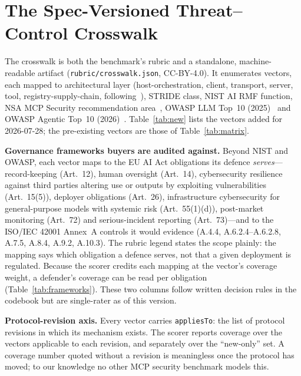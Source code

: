 \documentclass[conference]{IEEEtran}
\newcommand{\rev}{2026-07-28}
\begin{document}
\section{The Spec-Versioned Threat--Control Crosswalk}\label{sec:crosswalk}
The crosswalk is both the benchmark's rubric and a standalone, machine-readable artifact (\texttt{rubric/crosswalk.json}, CC-BY-4.0). It enumerates \nVectors{} vectors, each mapped to architectural layer (host-orchestration, client, transport, server, tool, registry-supply-chain, following~\cite{mcpdpt2604}), STRIDE class, NIST AI RMF function, NSA MCP Security recommendation area~\cite{nsamcp2026}, OWASP LLM Top~10 (2025)~\cite{owaspllm2025} and OWASP Agentic Top~10 (2026)~\cite{owaspasi2026}. Table~\ref{tab:new} lists the \nNew{} vectors added for \rev; the \nOrig{} pre-existing vectors are those of Table~\ref{tab:matrix}.

\textbf{Governance frameworks buyers are audited against.} Beyond NIST and OWASP, each vector maps to the EU AI Act obligations its defence \emph{serves}---record-keeping (Art.~12), human oversight (Art.~14), cybersecurity resilience against third parties altering use or outputs by exploiting vulnerabilities (Art.~15(5)), deployer obligations (Art.~26), infrastructure cybersecurity for general-purpose models with systemic risk (Art.~55(1)(d)), post-market monitoring (Art.~72) and serious-incident reporting (Art.~73)---and to the ISO/IEC 42001 Annex~A controls it would evidence (A.4.4, A.6.2.4--A.6.2.8, A.7.5, A.8.4, A.9.2, A.10.3). The rubric legend states the scope plainly: the mapping says which obligation a defence serves, not that a given deployment is regulated. Because the scorer credits each mapping at the vector's coverage weight, a defender's coverage can be read per obligation (Table~\ref{tab:frameworks}). These two columns follow written decision rules in the codebook but are single-rater as of this version.

\begin{table}[t]
\caption{Reference-proxy coverage rolled up per EU AI Act obligation and ISO/IEC 42001 control (development corpus, \nVectors{} vectors).}
\label{tab:frameworks}
\centering\scriptsize
\resizebox{\columnwidth}{!}{}
\end{table}

\textbf{Protocol-revision axis.} Every vector carries \texttt{appliesTo}: the list of protocol revisions in which its mechanism exists. The scorer reports coverage over the vectors applicable to each revision, and separately over the ``new-only'' set. A coverage number quoted without a revision is meaningless once the protocol has moved; to our knowledge no other MCP security benchmark models this.
\end{document}

